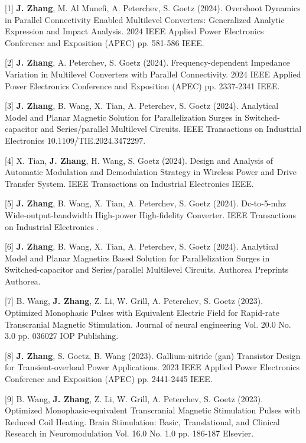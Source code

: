 [1] \textbf{J. Zhang}, M. Al Munefi, A. Peterchev, S. Goetz (2024). Overshoot Dynamics in Parallel Connectivity Enabled Multilevel Converters: Generalized Analytic Expression and Impact Analysis. 2024 IEEE Applied Power Electronics Conference and Exposition (APEC)   pp. 581-586 IEEE.

[2] \textbf{J. Zhang}, A. Peterchev, S. Goetz (2024). Frequency-dependent Impedance Variation in Multilevel Converters with Parallel Connectivity. 2024 IEEE Applied Power Electronics Conference and Exposition (APEC)   pp. 2337-2341 IEEE.

[3] \textbf{J. Zhang}, B. Wang, X. Tian, A. Peterchev, S. Goetz (2024). Analytical Model and Planar Magnetic Solution for Parallelization Surges in Switched-capacitor and Series/parallel Multilevel Circuits. IEEE Transactions on Industrial Electronics    10.1109/TIE.2024.3472297.

[4] X. Tian, \textbf{J. Zhang}, H. Wang, S. Goetz (2024). Design and Analysis of Automatic Modulation and Demodulation Strategy in Wireless Power and Drive Transfer System. IEEE Transactions on Industrial Electronics    IEEE.

[5] \textbf{J. Zhang}, B. Wang, X. Tian, A. Peterchev, S. Goetz (2024). Dc-to-5-mhz Wide-output-bandwidth High-power High-fidelity Converter. IEEE Transactions on Industrial Electronics    .

[6] \textbf{J. Zhang}, B. Wang, X. Tian, A. Peterchev, S. Goetz (2024). Analytical Model and Planar Magnetics Based Solution for Parallelization Surges in Switched-capacitor and Series/parallel Multilevel Circuits. Authorea Preprints    Authorea.

[7] B. Wang, \textbf{J. Zhang}, Z. Li, W. Grill, A. Peterchev, S. Goetz (2023). Optimized Monophasic Pulses with Equivalent Electric Field for Rapid-rate Transcranial Magnetic Stimulation. Journal of neural engineering Vol. 20.0 No. 3.0 pp. 036027 IOP Publishing.

[8] \textbf{J. Zhang}, S. Goetz, B. Wang (2023). Gallium-nitride (gan) Transistor Design for Transient-overload Power Applications. 2023 IEEE Applied Power Electronics Conference and Exposition (APEC)   pp. 2441-2445 IEEE.

[9] B. Wang, \textbf{J. Zhang}, Z. Li, W. Grill, A. Peterchev, S. Goetz (2023). Optimized Monophasic-equivalent Transcranial Magnetic Stimulation Pulses with Reduced Coil Heating. Brain Stimulation: Basic, Translational, and Clinical Research in Neuromodulation Vol. 16.0 No. 1.0 pp. 186-187 Elsevier.

